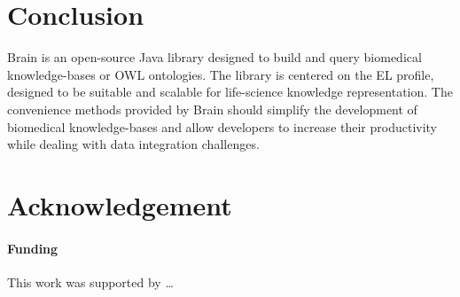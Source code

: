 \documentclass{bioinfo}
\begin{document}
\section{Conclusion}
Brain is an open-source Java library designed to build and query biomedical knowledge-bases or OWL ontologies.
The library is centered on the EL profile, designed to be suitable and scalable for life-science knowledge representation. 
The convenience methods provided by Brain should simplify the development of biomedical knowledge-bases and allow developers
to increase their productivity while dealing with data integration challenges.

\section*{Acknowledgement}
\paragraph{Funding\textcolon}
This work was supported by …
 
%  
%  
%  
%  
%  
% 
%  
% 
%  
 
\end{document}
